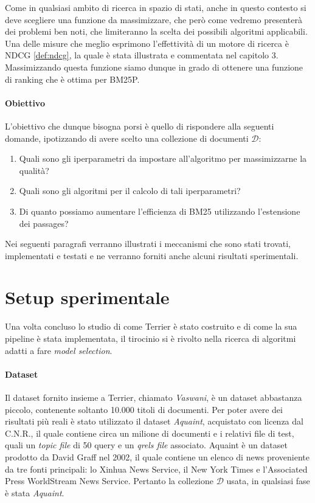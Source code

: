 Come in qualsiasi ambito di ricerca in spazio di stati, anche in questo contesto
si deve scegliere una funzione da massimizzare, che però come vedremo presenterà dei problemi ben
noti, che limiteranno la scelta dei possibili algoritmi applicabili.
Una delle misure che meglio esprimono l'effettività di un motore di ricerca è NDCG \ref{def:ndcg}, la quale è
stata illustrata e commentata nel capitolo 3.
Massimizzando questa funzione siamo dunque in grado di ottenere una funzione di ranking che
è ottima per BM25P.

\paragraph{Obiettivo}
L'obiettivo che dunque bisogna porsi è quello di rispondere alla seguenti domande, ipotizzando
di avere scelto una collezione di documenti $\mathcal{D}$:

\begin{enumerate}
	\item Quali sono gli iperparametri da impostare all'algoritmo per massimizzarne la qualità?
	\item Quali sono gli algoritmi per il calcolo di tali iperparametri?
	\item Di quanto possiamo aumentare l'efficienza di BM25 utilizzando l'estensione dei passages?
\end{enumerate}

Nei seguenti paragrafi verranno illustrati i meccanismi che sono stati
trovati, implementati e testati e ne verranno forniti anche alcuni risultati
sperimentali.

\section{Setup sperimentale}

Una volta concluso lo studio di come Terrier è stato costruito e di come la sua pipeline è stata implementata,
il tirocinio si è rivolto nella ricerca di algoritmi adatti a fare \textit{model selection}.

\paragraph{Dataset}
Il dataset fornito insieme a Terrier, chiamato \textit{Vaswani}, è un dataset abbastanza piccolo,
contenente soltanto 10.000 titoli di documenti. Per poter avere dei risultati più
reali è stato utilizzato il dataset \textit{Aquaint}, acquistato con licenza dal C.N.R.,
il quale contiene circa un milione di documenti e i relativi file di test, quali
un \textit{topic file} di 50 query e un \textit{qrels file} associato.
Aquaint è un dataset prodotto da David Graff nel 2002, il quale
contiene un elenco di news proveniente da tre fonti principali:
lo Xinhua News Service, il New York Times e l'Associated Press WorldStream News Service.
Pertanto la collezione $\mathcal{D}$ usata, in qualsiasi fase è stata \textit{Aquaint}.

